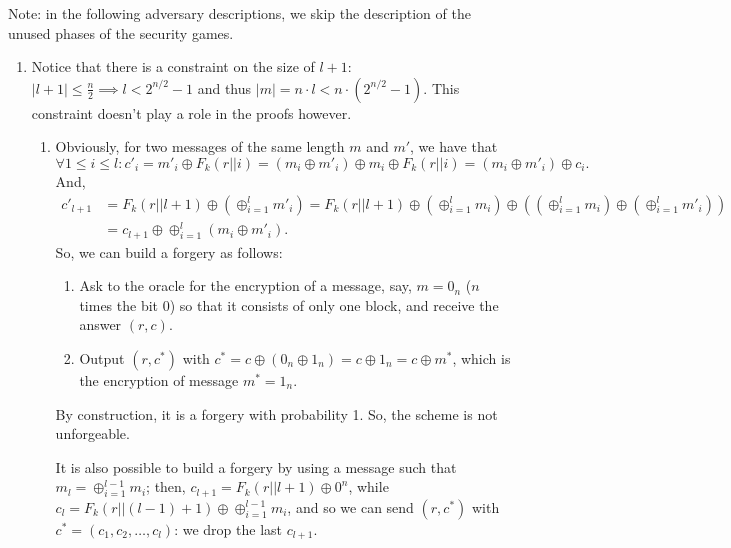 \begin{solution}
	Note: in the following adversary descriptions, we skip the description of the unused phases of the security games.
	\begin{enumerate}
		\item Notice that there is a constraint on the size of $l+1$: $|l+1| \le \frac{n}{2} \implies l < 2^{n/2}-1$ and thus $|m|=n\cdot l < n\cdot (2^{n/2}-1)$.
		This constraint doesn't play a role in the proofs however.

		\begin{enumerate}
			\item Obviously, for two messages of the same length $m$ and $m'$, we have that \[\forall 1 \le i \le l\colon c'_i = m'_i \oplus F_k(r||i) = (m_i\oplus m'_i) \oplus m_i \oplus F_k(r||i) = (m_i\oplus m'_i) \oplus c_i.\]
			And,
			\begin{align*}
				c'_{l+1} &= F_k(r||l+1) \oplus (\oplus_{i=1}^l m'_i) = F_k(r||l+1) \oplus (\oplus_{i=1}^l m_i) \oplus \left((\oplus_{i=1}^l m_i) \oplus (\oplus_{i=1}^l m'_i)\right) \\
				&= c_{l+1} \oplus \oplus_{i=1}^l (m_i\oplus m'_i).
			\end{align*}
			So, we can build a forgery as follows:
			\begin{enumerate}
				\item Ask to the oracle for the encryption of a message, say, $m=0_n$ ($n$ times the bit $0$) so that it consists of only one block, and receive the answer $(r, c)$.
				\item Output $(r, c^*)$ with $c^* = c \oplus (0_n \oplus 1_n) = c \oplus 1_n = c \oplus m^*$, which is the encryption of message $m^*=1_n$.
			\end{enumerate}
			By construction, it is a forgery with probability 1. So, the scheme is not unforgeable.

			It is also possible to build a forgery by using a message such that $m_{l}=\oplus_{i=1}^{l-1} m_i$;
			then, $c_{l+1}=F_k(r||l+1) \oplus 0^n$, while $c_l=F_k(r||(l-1)+1)\oplus \oplus_{i=1}^{l-1} m_i$,
			and so we can send $(r, c^*)$ with $c^*=(c_1, c_2, \dots, c_{l})$: we drop the last $c_{l+1}$.


\end{enumerate}
\end{enumerate}
\end{solution}
